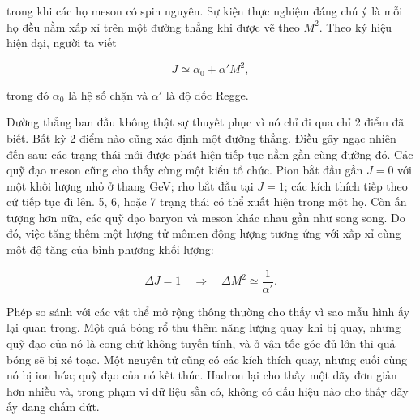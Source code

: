trong khi các họ meson có spin nguyên. Sự kiện thực nghiệm đáng chú ý là
mỗi họ đều nằm xấp xỉ trên một đường thẳng khi được vẽ theo
\(M^2\). Theo ký hiệu hiện đại, người ta viết

\begin{equation}
  J\simeq \alpha_0+\alpha' M^2,
  \label{eq:l01-regge-trajectory}
\end{equation}

trong đó \(\alpha_0\) là hệ số chặn và \(\alpha'\) là độ dốc Regge.

Đường thẳng ban đầu không thật sự thuyết phục vì nó chỉ đi qua chỉ
2 điểm đã biết. Bất kỳ 2 điểm nào cũng xác định một đường thẳng. Điều gây ngạc nhiên đến sau:
các trạng thái mới được phát hiện tiếp tục nằm gần cùng đường đó. Các quỹ đạo meson
cũng cho thấy cùng một kiểu tổ chức. Pion bắt đầu gần \(J=0\) với
một khối lượng nhỏ ở thang GeV; rho bắt đầu tại \(J=1\); các kích thích tiếp theo
cứ tiếp tục đi lên. 5, 6, hoặc 7 trạng thái có thể xuất hiện trong một họ. Còn ấn tượng
hơn nữa, các quỹ đạo baryon và meson khác nhau gần như
song song. Do đó, việc tăng thêm một lượng tử mômen động lượng tương ứng
với xấp xỉ cùng một độ tăng của bình phương khối lượng:

\begin{equation}
  \Delta J=1
  \quad\Longrightarrow\quad
  \Delta M^2\simeq \frac{1}{\alpha'}.
  \label{eq:l01-regge-spacing}
\end{equation}

\begin{classroomqa}
\end{classroomqa}

Phép so sánh với các vật thể mở rộng thông thường cho thấy vì sao mẫu hình ấy lại quan trọng.
Một quả bóng rổ thu thêm năng lượng quay khi bị quay, nhưng quỹ đạo của nó
là cong chứ không tuyến tính, và ở vận tốc góc đủ lớn thì quả bóng sẽ bị xé toạc.
Một nguyên tử cũng có các kích thích quay, nhưng cuối cùng nó bị ion hóa;
quỹ đạo của nó kết thúc. Hadron lại cho thấy một dãy đơn giản hơn nhiều và,
trong phạm vi dữ liệu sẵn có, không có dấu hiệu nào cho thấy dãy ấy đang chấm dứt.

